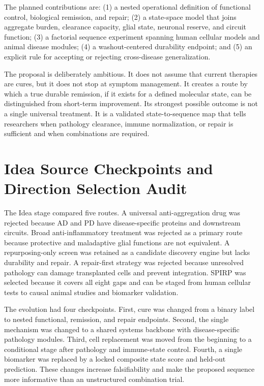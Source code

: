 \documentclass[conference]{IEEEtran}
\begin{document}
The planned contributions are: (1) a nested operational definition of functional control, biological remission, and repair; (2) a state-space model that joins aggregate burden, clearance capacity, glial state, neuronal reserve, and circuit function; (3) a factorial sequence experiment spanning human cellular models and animal disease modules; (4) a washout-centered durability endpoint; and (5) an explicit rule for accepting or rejecting cross-disease generalization.

The proposal is deliberately ambitious. It does not assume that current therapies are cures, but it does not stop at symptom management. It creates a route by which a true durable remission, if it exists for a defined molecular state, can be distinguished from short-term improvement. Its strongest possible outcome is not a single universal treatment. It is a validated state-to-sequence map that tells researchers when pathology clearance, immune normalization, or repair is sufficient and when combinations are required.

\section{Idea Source Checkpoints and Direction Selection Audit}
The Idea stage compared five routes. A universal anti-aggregation drug was rejected because AD and PD have disease-specific proteins and downstream circuits. Broad anti-inflammatory treatment was rejected as a primary route because protective and maladaptive glial functions are not equivalent. A repurposing-only screen was retained as a candidate discovery engine but lacks durability and repair. A repair-first strategy was rejected because unresolved pathology can damage transplanted cells and prevent integration. SPIRP was selected because it covers all eight gaps and can be staged from human cellular tests to causal animal studies and biomarker validation.

The evolution had four checkpoints. First, cure was changed from a binary label to nested functional, remission, and repair endpoints. Second, the single mechanism was changed to a shared systems backbone with disease-specific pathology modules. Third, cell replacement was moved from the beginning to a conditional stage after pathology and immune-state control. Fourth, a single biomarker was replaced by a locked composite state score and held-out prediction. These changes increase falsifiability and make the proposed sequence more informative than an unstructured combination trial.
\end{document}
